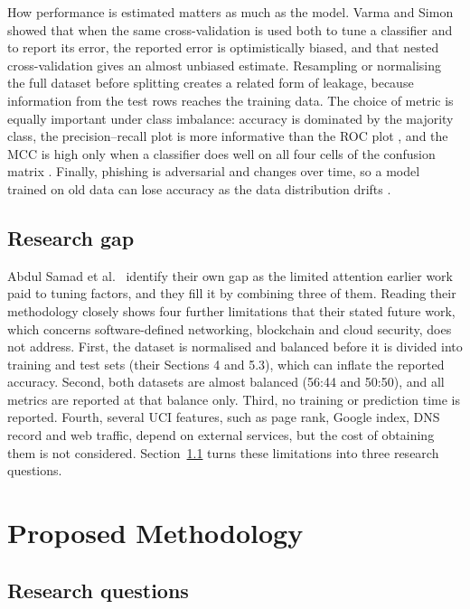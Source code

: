 \documentclass[pdflatex,sn-mathphys-num]{sn-jnl}%
\theoremstyle{thmstyleone}%
\theoremstyle{thmstyletwo}%
\theoremstyle{thmstylethree}%
\begin{document}
How performance is estimated matters as much as the model. Varma and Simon \cite{varma2006} showed that when the same cross-validation is used both to tune a classifier and to report its error, the reported error is optimistically biased, and that nested cross-validation gives an almost unbiased estimate. Resampling or normalising the full dataset before splitting creates a related form of leakage, because information from the test rows reaches the training data. The choice of metric is equally important under class imbalance: accuracy is dominated by the majority class, the precision--recall plot is more informative than the ROC plot \cite{saito2015}, and the MCC is high only when a classifier does well on all four cells of the confusion matrix \cite{chicco2020}. Finally, phishing is adversarial and changes over time, so a model trained on old data can lose accuracy as the data distribution drifts \cite{gama2014}.

\subsection{Research gap}\label{subsec2-4}

Abdul Samad et al.\ \cite{abdulsamad2023} identify their own gap as the limited attention earlier work paid to tuning factors, and they fill it by combining three of them. Reading their methodology closely shows four further limitations that their stated future work, which concerns software-defined networking, blockchain and cloud security, does not address. First, the dataset is normalised and balanced before it is divided into training and test sets (their Sections 4 and 5.3), which can inflate the reported accuracy. Second, both datasets are almost balanced (56:44 and 50:50), and all metrics are reported at that balance only. Third, no training or prediction time is reported. Fourth, several UCI features, such as page rank, Google index, DNS record and web traffic, depend on external services, but the cost of obtaining them is not considered. Section~\ref{subsec3-1} turns these limitations into three research questions.

\section{Proposed Methodology}\label{sec3}

\subsection{Research questions}\label{subsec3-1}
\end{document}
